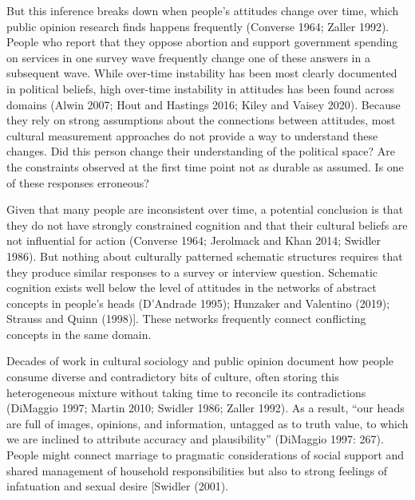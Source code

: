 \documentclass[12pt,]{article}
\begin{document}
But this inference breaks down when people's attitudes change over time, which public opinion research finds happens frequently (Converse 1964; Zaller 1992). People who report that they oppose abortion and support government spending on services in one survey wave frequently change one of these answers in a subsequent wave. While over-time instability has been most clearly documented in political beliefs, high over-time instability in attitudes has been found across domains (Alwin 2007; Hout and Hastings 2016; Kiley and Vaisey 2020). Because they rely on strong assumptions about the connections between attitudes, most cultural measurement approaches do not provide a way to understand these changes. Did this person change their understanding of the political space? Are the constraints observed at the first time point not as durable as assumed. Is one of these responses erroneous?

Given that many people are inconsistent over time, a potential conclusion is that they do not have strongly constrained cognition and that their cultural beliefs are not influential for action (Converse 1964; Jerolmack and Khan 2014; Swidler 1986). But nothing about culturally patterned schematic structures requires that they produce similar responses to a survey or interview question. Schematic cognition exists well below the level of attitudes in the networks of abstract concepts in people's heads (D'Andrade 1995); Hunzaker and Valentino (2019); Strauss and Quinn (1998){]}. These networks frequently connect conflicting concepts in the same domain.

Decades of work in cultural sociology and public opinion document how people consume diverse and contradictory bits of culture, often storing this heterogeneous mixture without taking time to reconcile its contradictions (DiMaggio 1997; Martin 2010; Swidler 1986; Zaller 1992). As a result, ``our heads are full of images, opinions, and information, untagged as to truth value, to which we are inclined to attribute accuracy and plausibility'' (DiMaggio 1997: 267). People might connect marriage to pragmatic considerations of social support and shared management of household responsibilities but also to strong feelings of infatuation and sexual desire {[}Swidler (2001).
\end{document}
